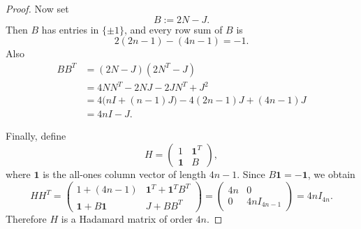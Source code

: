 \documentclass[11pt, a4paper]{ctexrep}
\begin{document}
\begin{proof}
    Now set
    \[
        B:=2N-J.
    \]
    Then \(B\) has entries in \(\{\pm1\}\), and every row sum of \(B\) is
    \[
        2(2n-1)-(4n-1)=-1.
    \]
    Also
    \[
        \begin{aligned}
            BB^T
             & =
            (2N-J)(2N^T-J) \\
             & =
            4NN^T-2NJ-2JN^T+J^2 \\
             & =
            4\bigl(nI+(n-1)J\bigr)-4(2n-1)J+(4n-1)J \\
             & =
            4nI-J.
        \end{aligned}
    \]

    Finally, define
    \[
        H=
        \begin{pmatrix}
            1          & \mathbf{1}^T \\
            \mathbf{1} & B
        \end{pmatrix},
    \]
    where \(\mathbf{1}\) is the all-ones column vector of length \(4n-1\). Since \(B\mathbf{1}=-\mathbf{1}\),
    we obtain
    \[
        HH^T
        =
        \begin{pmatrix}
            1+(4n-1)      & \mathbf{1}^T+\mathbf{1}^TB^T \\
            \mathbf{1}+B\mathbf{1} & J+BB^T
        \end{pmatrix}
        =
        \begin{pmatrix}
            4n & 0 \\
            0  & 4nI_{4n-1}
        \end{pmatrix}
        =
        4nI_{4n}.
    \]
    Therefore \(H\) is a Hadamard matrix of order \(4n\).
\end{proof}
\end{document}
